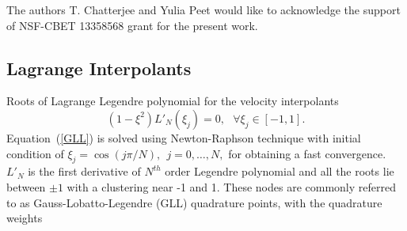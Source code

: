 \documentclass[times]{fldauth}
\begin{document}
\ack The authors T. Chatterjee and Yulia Peet would like to acknowledge the support of NSF-CBET 13358568 grant for the present work.



\begin{appendices}
  \renewcommand\thetable{\thesection\arabic{table}}
  \renewcommand\thefigure{\thesection\arabic{figure}}
  \section{}
  \subsection{Lagrange Interpolants}
  Roots of Lagrange Legendre polynomial for the velocity interpolants
\begin{equation}
(1-\xi^{2})L'_{N}(\xi_j) = 0, \ \ \ \forall \xi_j \in [-1,1]. \label{GLL}
\end{equation}
 Equation~(\ref{GLL}) is solved using Newton-Raphson technique with initial condition of $\xi_j = \cos(j\pi/N), \ \ j = 0,\ldots, N,$ for obtaining a fast convergence. $L'_{N}$ is the first derivative of $N^{th}$ order Legendre polynomial and all the roots lie between $\pm 1$ with a clustering near -1 and 1. These nodes are commonly referred to as Gauss-Lobatto-Legendre (GLL) quadrature points, with the quadrature weights
 

\end{appendices}
\end{document}
